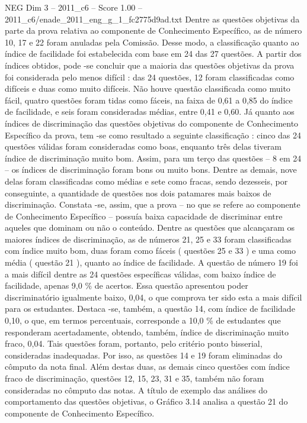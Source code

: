 \begin{textsample}{NEG Dim 3 – 2011\_c6 – Score 1.00 – 2011\_c6/enade\_2011\_eng\_g\_1\_fc2775d9ad.txt}
Dentre as questões objetivas da parte da prova relativa ao componente de Conhecimento Específico, as de número 10, 17 e 22 foram anuladas pela Comissão.
Desse modo, a classificação quanto ao índice de facilidade foi estabelecida com base em 24 das 27 questões.
A partir dos índices obtidos, pode -se concluir que a maioria das questões objetivas da prova foi considerada pelo menos difícil : das 24 questões, 12 foram classificadas como difíceis e duas como muito difíceis.
Não houve questão classificada como muito fácil, quatro questões foram tidas como fáceis, na faixa de 0,61 a 0,85 do índice de facilidade, e seis foram consideradas médias, entre 0,41 e 0,60.
Já quanto aos índices de discriminação das questões objetivas do componente de Conhecimento Específico da prova, tem -se como resultado a seguinte classificação : cinco das 24 questões válidas foram consideradas como boas, enquanto três delas tiveram índice de discriminação muito bom.
Assim, para um terço das questões – 8 em 24 – os índices de discriminação foram bons ou muito bons.
Dentre as demais, nove delas foram classificadas como médias e sete como fracas, sendo dezesseis, por conseguinte, a quantidade de questões nos dois patamares mais baixos de discriminação.
Constata -se, assim, que a prova – no que se refere ao componente de Conhecimento Específico – possuía baixa capacidade de discriminar entre aqueles que dominam ou não o conteúdo.
Dentre as questões que alcançaram os maiores índices de discriminação, as de números 21, 25 e 33 foram classificadas com índice muito bom, duas foram como fáceis ( questões 25 e 33 ) e uma como média ( questão 21 ), quanto ao índice de facilidade.
A questão de número 19 foi a mais difícil dentre as 24 questões específicas válidas, com baixo índice de facilidade, apenas 9,0 \% de acertos.
Essa questão apresentou poder discriminatório igualmente baixo, 0,04, o que comprova ter sido esta a mais difícil para os estudantes.
Destaca -se, também, a questão 14, com índice de facilidade 0,10, o que, em termos percentuais, corresponde a 10,0 \% de estudantes que responderam acertadamente, obtendo, também, índice de discriminação muito fraco, 0,04.
Tais questões foram, portanto, pelo critério ponto bisserial, consideradas inadequadas.
Por isso, as questões 14 e 19 foram eliminadas do cômputo da nota final.
Além destas duas, as demais cinco questões com índice fraco de discriminação, questões 12, 15, 23, 31 e 35, também não foram consideradas no cômputo das notas.
A título de exemplo das análises do comportamento das questões objetivas, o Gráfico 3.14 analisa a questão 21 do componente de Conhecimento Específico.

\end{textsample}
